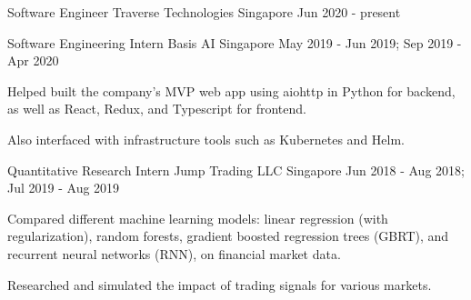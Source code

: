 

\begin{cventries}

  \cventry
  {Software Engineer} %
  {Traverse Technologies} %
  {Singapore} %
  {Jun 2020 - present} %
  {
    \begin{cvitems} %
    \end{cvitems}
  }

  \cventry
  {Software Engineering Intern} %
  {Basis AI} %
  {Singapore} %
  {May 2019 - Jun 2019; Sep 2019 - Apr 2020} %
  {
    \begin{cvitems} %
    \item {Helped built the company's MVP web app using aiohttp in Python for backend, as well as React, Redux, and Typescript for frontend.}
    \item {Also interfaced with infrastructure tools such as Kubernetes and Helm.}
    \end{cvitems}
  }

  \cventry
  {Quantitative Research Intern} %
  {Jump Trading LLC} %
  {Singapore} %
  {Jun 2018 - Aug 2018; Jul 2019 - Aug 2019} %
  {
    \begin{cvitems} %
    \item {Compared different machine learning models: linear regression (with regularization), random forests, gradient boosted regression trees (GBRT), and recurrent neural networks (RNN), on financial market data.}
    \item {Researched and simulated the impact of trading signals for various markets.}
    \end{cvitems}
  }


\end{cventries}
